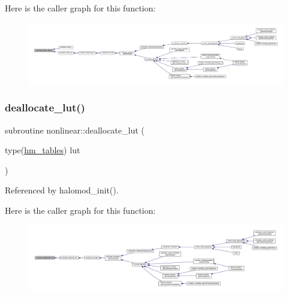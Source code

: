 Here is the caller graph for this function\+:
\nopagebreak
\begin{figure}[H]
\begin{center}
\leavevmode
\includegraphics[width=350pt]{namespacenonlinear_a8d293985858b08d5e5c5bbdcdc9d4280_icgraph}
\end{center}
\end{figure}
\mbox{\label{namespacenonlinear_a9a42cb3acfe84c2c6ea9f085b357bdd1}} 
\subsubsection{\texorpdfstring{deallocate\+\_\+lut()}{deallocate\_lut()}}
{\footnotesize\ttfamily subroutine nonlinear\+::deallocate\+\_\+lut (\begin{DoxyParamCaption}\item[{type(\mbox{\hyperlink{structnonlinear_1_1hm__tables}{hm\+\_\+tables}})}]{lut }\end{DoxyParamCaption})\hspace{0.3cm}{\ttfamily [private]}}



Referenced by halomod\+\_\+init().

Here is the caller graph for this function\+:
\nopagebreak
\begin{figure}[H]
\begin{center}
\leavevmode
\includegraphics[width=350pt]{namespacenonlinear_a9a42cb3acfe84c2c6ea9f085b357bdd1_icgraph}
\end{center}
\end{figure}
\mbox{\label{namespacenonlinear_a927f840ecd0f2086eefba9d7220e3279}} 
